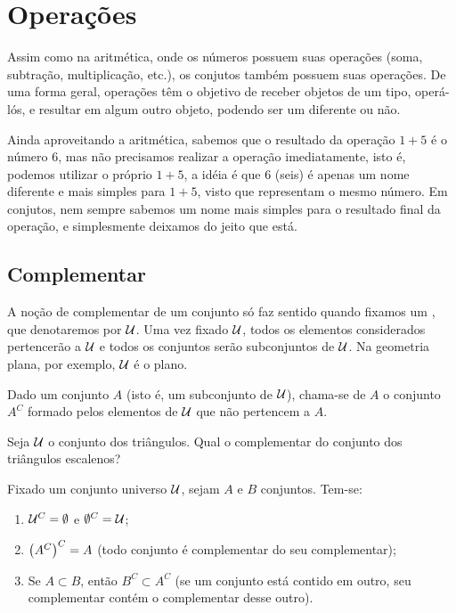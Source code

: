 \section{Operações}
Assim como na aritmética, onde os números possuem suas operações (soma, subtração,  multiplicação, etc.), os conjutos também possuem suas operações.
De uma forma geral, operações têm o objetivo de receber objetos de um tipo, operá-lós, e resultar em algum outro objeto, podendo ser um diferente ou não.

Ainda aproveitando a aritmética, sabemos que o resultado da operação $1 + 5$ é o número $6$, mas não precisamos realizar a operação imediatamente, isto é, podemos utilizar o próprio $1 + 5$, a idéia é que $6$ (seis) é apenas um nome diferente e mais simples para $1 + 5$, visto que representam o mesmo número.
Em conjutos, nem sempre sabemos um nome mais simples para o resultado final da operação, e simplesmente deixamos do jeito que está.

\subsection{Complementar}
A noção de complementar de um conjunto só faz sentido quando fixamos um , que denotaremos por $\mathcal{U}$. Uma vez fixado $\mathcal{U}$, todos os elementos considerados pertencerão a $\mathcal{U}$ e todos os conjuntos serão subconjuntos de $\mathcal{U}$. Na geometria plana, por exemplo, $\mathcal{U}$ é o plano.

\begin{definition}
Dado um conjunto $A$ (isto é, um subconjunto de $\mathcal{U}$), chama-se  de $A$ o conjunto $A^C$ formado pelos elementos de $\mathcal{U}$ que não pertencem a $A$.
\end{definition}

\begin{example}
Seja $\mathcal{U}$ o conjunto dos triângulos. Qual o complementar do conjunto dos triângulos escalenos?
\end{example}

\begin{proposition}
\label{prop-complementar}
Fixado um conjunto universo $\mathcal{U}$, sejam $A$ e $B$ conjuntos. Tem-se:
%
\begin{enumerate}
	\item $\mathcal{U}^C=\emptyset$ e $\emptyset^C = \mathcal{U}$;
	\item $\left(A^C\right)^C=A$ (todo conjunto é complementar do seu complementar);
	\item Se $A \subset B$, então $B^C \subset A^C$ (se um conjunto está contido em outro, seu complementar contém o complementar desse outro). 
\end{enumerate}
\end{proposition}

